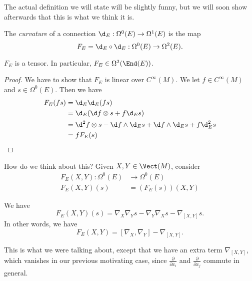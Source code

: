 \documentclass[a4paper]{article}
\begin{document}
The actual definition we will state will be slightly funny, but we will soon show afterwards that this is what we think it is.
\begin{defi}[Curvature]
  The \emph{curvature} of a connection $\d_E: \Omega^0(E) \to \Omega^1(E)$ is the map
  \[
    F_E = \d_E \circ \d_E: \Omega^0(E) \to \Omega^2(E).
  \]
\end{defi}

\begin{lemma}
  $F_E$ is a tensor. In particular, $F_E \in \Omega^2(\End(E))$.
\end{lemma}

\begin{proof}
  We have to show that $F_E$ is linear over $C^\infty(M)$. We let $f \in C^\infty(M)$ and $s \in \Omega^0(E)$. Then we have
  \begin{align*}
    F_E(fs) &= \d_E \d_E (fs)\\
    &= \d_E(\d f \otimes s + f \d_E s)\\
    &= \d^2 f \otimes s - \d f \wedge \d_E s + \d f \wedge \d_E s + f \d_E^2 s\\
    &= f F_E(s) \qedhere
  \end{align*}
\end{proof}

How do we think about this? Given $X, Y \in \Vect(M)$, consider
\begin{align*}
  F_E(X, Y) : \Omega^0(E) &\to \Omega^0(E)\\
  F_E(X, Y)(s) &= (F_E(s))(X, Y)
\end{align*}

\begin{lemma}
  We have
  \[
    F_E(X, Y)(s) = \nabla_X \nabla_Y s - \nabla_Y \nabla_X s - \nabla_{[X, Y]}s.
  \]
  In other words, we have
  \[
    F_E(X, Y) = [\nabla_X, \nabla_Y] - \nabla_{[X, Y]}.
  \]
\end{lemma}
This is what we were talking about, except that we have an extra term $\nabla_{[X, Y]}$, which vanishes in our previous motivating case, since $\frac{\partial}{\partial x_i}$ and $\frac{\partial}{\partial x_j}$ commute in general.
\end{document}
